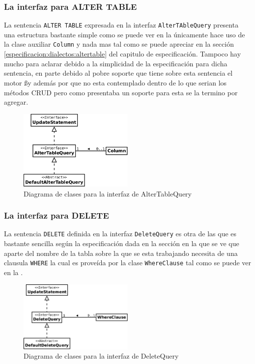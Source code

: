 \subsubsection{La interfaz para ALTER TABLE}
La sentencia \verb=ALTER TABLE= expresada en la interfaz \verb=AlterTAbleQuery= presenta una estructura bastante simple como se puede ver en la  únicamente hace uso de la clase auxiliar \verb=Column= y nada mas tal como se puede apreciar en la sección \ref{especificacion:dialectos:altertable} del capitulo de especificación. Tampoco hay mucho para aclarar debido a la simplicidad de la especificación para dicha sentencia, en parte debido al pobre soporte que tiene sobre esta sentencia el motor \ss y además por que no esta contemplado dentro de lo que serian los métodos CRUD pero como \cc presentaba un soporte para esta se la termino por agregar.
\begin{figure}
  \centering
    \includegraphics[width=0.5\textwidth]{figuras/jdbgm-dc-altertable.png}
  \caption{Diagrama de clases para la interfaz de AlterTableQuery}
  \label{fig:dc-altertabletquery}
\end{figure}
%
\subsubsection{La interfaz para DELETE}
La sentencia \verb=DELETE= definida en la interfaz \verb=DeleteQuery= es otra de las que es bastante sencilla según la especificación dada en la sección  en la que se ve que aparte del nombre de la tabla sobre la que se esta trabajando necesita de una clausula \verb=WHERE= la cual es proveída por la clase \verb=WhereClause= tal como se puede ver en la .
%
\begin{figure}
  \centering
    \includegraphics[width=0.5\textwidth]{figuras/jdbgm-dc-delete.png}
  \caption{Diagrama de clases para la interfaz de DeleteQuery}
  \label{fig:dc-deletequery}
\end{figure}
%
